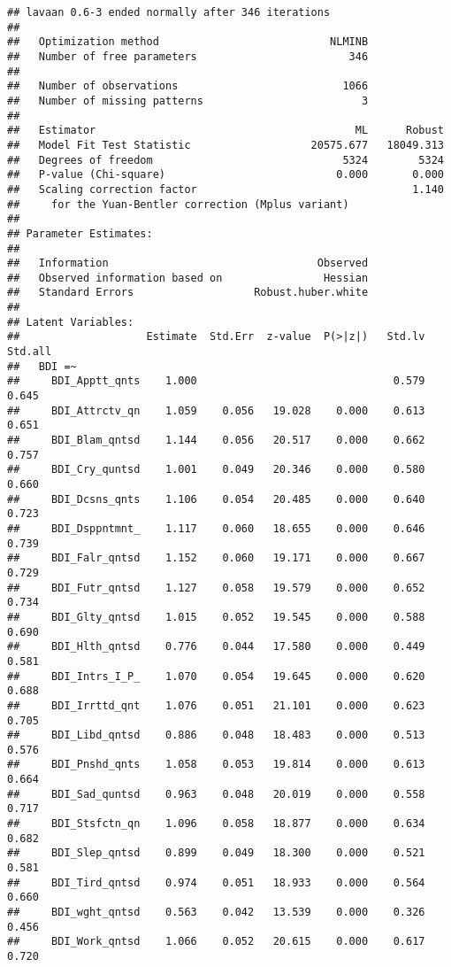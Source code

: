 \documentclass[]{article}
\begin{document}
\begin{verbatim}
## lavaan 0.6-3 ended normally after 346 iterations
## 
##   Optimization method                           NLMINB
##   Number of free parameters                        346
## 
##   Number of observations                          1066
##   Number of missing patterns                         3
## 
##   Estimator                                         ML      Robust
##   Model Fit Test Statistic                   20575.677   18049.313
##   Degrees of freedom                              5324        5324
##   P-value (Chi-square)                           0.000       0.000
##   Scaling correction factor                                  1.140
##     for the Yuan-Bentler correction (Mplus variant)
## 
## Parameter Estimates:
## 
##   Information                                 Observed
##   Observed information based on                Hessian
##   Standard Errors                   Robust.huber.white
## 
## Latent Variables:
##                    Estimate  Std.Err  z-value  P(>|z|)   Std.lv  Std.all
##   BDI =~                                                                
##     BDI_Apptt_qnts    1.000                               0.579    0.645
##     BDI_Attrctv_qn    1.059    0.056   19.028    0.000    0.613    0.651
##     BDI_Blam_qntsd    1.144    0.056   20.517    0.000    0.662    0.757
##     BDI_Cry_quntsd    1.001    0.049   20.346    0.000    0.580    0.660
##     BDI_Dcsns_qnts    1.106    0.054   20.485    0.000    0.640    0.723
##     BDI_Dsppntmnt_    1.117    0.060   18.655    0.000    0.646    0.739
##     BDI_Falr_qntsd    1.152    0.060   19.171    0.000    0.667    0.729
##     BDI_Futr_qntsd    1.127    0.058   19.579    0.000    0.652    0.734
##     BDI_Glty_qntsd    1.015    0.052   19.545    0.000    0.588    0.690
##     BDI_Hlth_qntsd    0.776    0.044   17.580    0.000    0.449    0.581
##     BDI_Intrs_I_P_    1.070    0.054   19.645    0.000    0.620    0.688
##     BDI_Irrttd_qnt    1.076    0.051   21.101    0.000    0.623    0.705
##     BDI_Libd_qntsd    0.886    0.048   18.483    0.000    0.513    0.576
##     BDI_Pnshd_qnts    1.058    0.053   19.814    0.000    0.613    0.664
##     BDI_Sad_quntsd    0.963    0.048   20.019    0.000    0.558    0.717
##     BDI_Stsfctn_qn    1.096    0.058   18.877    0.000    0.634    0.682
##     BDI_Slep_qntsd    0.899    0.049   18.300    0.000    0.521    0.581
##     BDI_Tird_qntsd    0.974    0.051   18.933    0.000    0.564    0.660
##     BDI_wght_qntsd    0.563    0.042   13.539    0.000    0.326    0.456
##     BDI_Work_qntsd    1.066    0.052   20.615    0.000    0.617    0.720

\end{verbatim}
\end{document}
